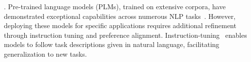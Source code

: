 
. 
%
%
%
%
Pre-trained language models (PLMs), trained on extensive corpora, have demonstrated exceptional capabilities across numerous NLP tasks~\cite{DBLP:journals/corr/abs-2310-06825, DBLP:journals/corr/abs-2302-13971,DBLP:journals/corr/abs-2205-01068,DBLP:journals/corr/abs-2311-16867}.
However, deploying these models for specific applications requires additional refinement through instruction tuning and preference alignment.
Instruction-tuning~\cite{DBLP:conf/iclr/WeiBZGYLDDL22,DBLP:conf/nips/DuboisLTZGBGLH23,DBLP:conf/nips/WangIDHKCWMSBH23} enables models to follow task descriptions given in natural language, facilitating generalization to new tasks. 
